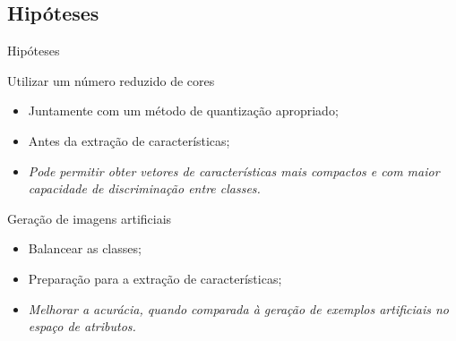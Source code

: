 \documentclass{beamer}
\begin{document}
\subsection{Hipóteses}
\setlength\leftmargini{1em}
\justifying
\begin{frame}{Hipóteses}
  \begin{block}{Utilizar um número reduzido de cores}
    \justifying
    \begin{itemize}
      \item Juntamente com um método de quantização apropriado;
      \item Antes da extração de características;
      \item \textit{Pode permitir obter vetores de características mais compactos e com maior capacidade de discriminação entre classes.}
    \end{itemize}
  \end{block}
  \begin{block}{Geração de imagens artificiais}
    \justifying
    \begin{itemize}
      \item Balancear as classes;
      \item Preparação para a extração de características;
      \item \textit{Melhorar a acurácia, quando comparada à geração de exemplos artificiais no espaço de atributos.}
    \end{itemize}
  \end{block}
\end{frame}
\end{document}
